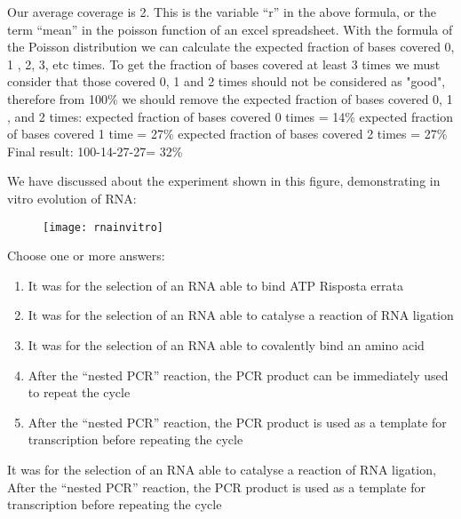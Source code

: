 \begin{Answer} [
  ref={ex42},
  number={1}
 ]

\Question Our average coverage is 2. This is the variable ``r'' in the above
formula, or the term ``mean'' in the poisson function of an excel spreadsheet.
With the formula of the Poisson distribution we can calculate the expected
fraction of bases covered 0, 1 , 2, 3, etc times. To get the fraction of bases
covered at least 3 times we must consider that those covered 0, 1 and 2 times
should not be considered as "good", therefore from 100\% we should remove the
expected fraction of bases covered 0, 1 , and 2 times:
expected fraction of bases covered 0 times = 14\%
expected fraction of bases covered 1 time = 27\%
expected fraction of bases covered 2 times = 27\%
Final result: 100-14-27-27= 32\%
\end{Answer}


\begin{Exercise} [
  label={ex43},
  origin={G. Valle}
 ]

We have discussed about the experiment shown in this figure, demonstrating in
vitro evolution of RNA:

\begin{figure}[H]
\centering
\texttt{[image: rnainvitro]}
\end{figure}

\Question Choose one or more answers:
\begin{enumerate}
\item It was for the selection of an RNA able to bind ATP Risposta errata
\item It was for the selection of an RNA able to catalyse a reaction of RNA
ligation
\item It was for the selection of an RNA able to covalently bind an amino acid
\item After the ``nested PCR'' reaction,  the PCR product can be immediately
used to repeat the cycle
\item After the ``nested PCR'' reaction,  the PCR product is used as a template
for transcription before repeating the cycle 
\end{enumerate}

\end{Exercise}

\begin{Answer} [
  ref={ex43},
  number={1}
 ]

\Question It was for the selection of an RNA able to catalyse a reaction of RNA
ligation, After the ``nested PCR'' reaction, the PCR product is used as a
template for transcription before repeating the cycle

\end{Answer}


